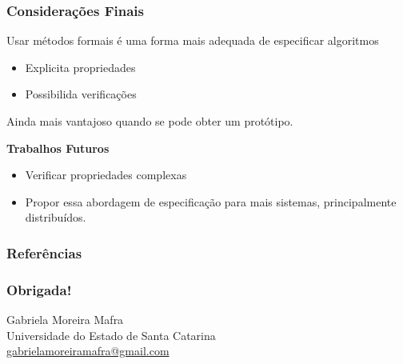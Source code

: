 \documentclass{beamer}
\begin{document}
  \begin{frame}
    \frametitle{Considerações Finais}

    Usar métodos formais é uma forma mais adequada de especificar algoritmos
    \begin{itemize}
    \item Explicita propriedades
    \item Possibilida verificações
    \end{itemize}
    Ainda mais vantajoso quando se pode obter um protótipo.\bigskip\\\pause

    \textbf{Trabalhos Futuros}
    \begin{itemize}
    \item Verificar propriedades complexas
    \item Propor essa abordagem de especificação para mais sistemas,
      principalmente distribuídos.
    \end{itemize}
  \end{frame}
  

  \begin{frame}
    \frametitle{Referências}
    
    
    
    
  \end{frame}

  \begin{frame}
    \frametitle{Obrigada!}
    
    Gabriela Moreira Mafra\\
    Universidade do Estado de Santa Catarina \\\medskip
    \vspace{-2mm}
    \url{gabrielamoreiramafra@gmail.com}



  \end{frame}
\end{document}
